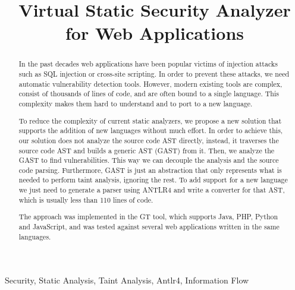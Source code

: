 \documentclass[conference]{IEEEtran}
\newcommand{\astname}{GAST}
\newcommand{\toolname}{GT}
\newcommand{\implangs}{Java, PHP, Python and JavaScript}
\begin{document}
\title{Virtual Static Security Analyzer for Web Applications}

\author{
\and
{}
\and
{}
}


\maketitle

\begin{abstract}
In the past decades web applications have been popular victims of injection attacks such as SQL injection or cross-site scripting. In order to prevent these attacks, we need automatic vulnerability detection tools. However, modern existing tools are complex, consist of thousands of lines of code, and are often bound to a single language. This complexity makes them hard to understand and to port to a new language. 


To reduce the complexity of current static analyzers, we propose a new solution that supports the addition of new languages without much effort. In order to achieve this, our solution does not analyze the source code AST directly, instead, it traverses the source code AST and builds a generic AST (\astname{}) from it. Then, we analyze the \astname{} to find vulnerabilities. This way we can decouple the analysis and the source code parsing. Furthermore, \astname{} is just an abstraction that only represents what is needed to perform taint analysis, ignoring the rest. To add support for a new language we just need to generate a parser using ANTLR4 \cite{antlr4book} and write a converter for that AST, which is usually less than 110 lines of code. 

The approach was implemented in the \toolname{} tool, which supports \implangs{}, and was tested against several web applications written in the same languages.
\end{abstract}
\begin{IEEEkeywords}
Security, Static Analysis, Taint Analysis, Antlr4, Information Flow
\end{IEEEkeywords}


















\end{document}
